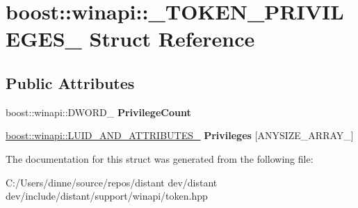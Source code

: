 \hypertarget{structboost_1_1winapi_1_1___t_o_k_e_n___p_r_i_v_i_l_e_g_e_s__}{}\section{boost\+:\+:winapi\+:\+:\+\_\+\+T\+O\+K\+E\+N\+\_\+\+P\+R\+I\+V\+I\+L\+E\+G\+E\+S\+\_\+ Struct Reference}
\label{structboost_1_1winapi_1_1___t_o_k_e_n___p_r_i_v_i_l_e_g_e_s__}
\subsection*{Public Attributes}
\begin{DoxyCompactItemize}
\item 
\mbox{\label{structboost_1_1winapi_1_1___t_o_k_e_n___p_r_i_v_i_l_e_g_e_s___a57b96b6257d9a25c4dc7d6583a926fad}} 
boost\+::winapi\+::\+D\+W\+O\+R\+D\+\_\+ {\bfseries Privilege\+Count}
\item 
\mbox{\label{structboost_1_1winapi_1_1___t_o_k_e_n___p_r_i_v_i_l_e_g_e_s___a9b00b7aca08298ee54e1bcb42a9c3f3e}} 
\mbox{\hyperlink{structboost_1_1winapi_1_1___l_u_i_d___a_n_d___a_t_t_r_i_b_u_t_e_s__}{boost\+::winapi\+::\+L\+U\+I\+D\+\_\+\+A\+N\+D\+\_\+\+A\+T\+T\+R\+I\+B\+U\+T\+E\+S\+\_\+}} {\bfseries Privileges} \mbox{[}A\+N\+Y\+S\+I\+Z\+E\+\_\+\+A\+R\+R\+A\+Y\+\_\+\mbox{]}
\end{DoxyCompactItemize}


The documentation for this struct was generated from the following file\+:\begin{DoxyCompactItemize}
\item 
C\+:/\+Users/dinne/source/repos/distant dev/distant dev/include/distant/support/winapi/token.\+hpp\end{DoxyCompactItemize}
